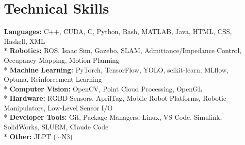 
\section{Technical Skills}
    \begin{itemize}[leftmargin=0.15in, label={}]
    \small{\item{
        \textbf{Languages:}{
            C++, CUDA, C, Python, Bash, MATLAB, Java, HTML, CSS, Haskell, XML
        } \\*
        \textbf{Robotics:}{
            ROS, Isaac Sim, Gazebo, SLAM, Admittance/Impedance Control, Occupancy Mapping, Motion Planning
        } \\*
        \textbf{Machine Learning:}{
            PyTorch, TensorFlow, YOLO, scikit-learn, MLflow, Optuna, Reinforcement Learning
        } \\*
        \textbf{Computer Vision:}{
            OpenCV, Point Cloud Processing, OpenGL
        } \\*
        \textbf{Hardware:}{
            RGBD Sensors, AprilTag, Mobile Robot Platforms, Robotic Manipulators, Low-Level Sensor I/O
        } \\*
        \textbf{Developer Tools:}{
            Git, Package Managers, Linux, VS Code, Simulink, SolidWorks, SLURM, Claude Code
        } \\*
        \textbf{Other:}{ JLPT ($\sim$N3)}
    }}
    \end{itemize}